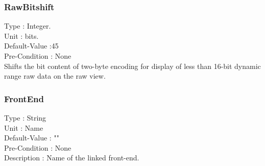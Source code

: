 \subsubsection{RawBitshift}
\noindent
Type : Integer.\\
Unit : bits.\\
Default-Value :45\\
Pre-Condition : None\\
Shifts the bit content of two-byte encoding for display of less than 16-bit dynamic range raw data on the raw view.\\

\subsubsection{FrontEnd}
\noindent
Type : String\\
Unit : Name\\
Default-Value : ""\\
Pre-Condition : None\\
Description : Name of the linked front-end.\\

